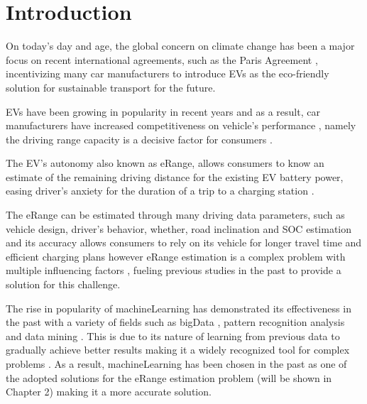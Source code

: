 \chapter{Introduction}
\label{cha:introduction}

On today's day and age, the global concern on climate
change has been a major focus on recent international agreements,
such as the Paris Agreement \citep{parisAgreement},
incentivizing many car manufacturers to introduce
\gls{EVs} as the eco-friendly
solution for sustainable transport for the future.

\gls{EVs} have been growing in popularity in
recent years and as a result, car manufacturers have
increased competitiveness on vehicle's performance
\citep{evCompetitiveness}, namely the driving range 
capacity is a decisive factor for consumers \citep{EGBUE2012717}.

The \gls{EV}'s autonomy also known as \gls{eRange},
allows consumers to know an estimate of the
remaining driving distance for the existing \gls{EV}
battery power, easing driver's anxiety for the duration
of a trip to a charging station \citep{eRangeFactors, driverAnxiety}.

The \gls{eRange} can be estimated through many
driving data parameters,
such as vehicle design, driver's behavior, whether,
road inclination and \gls{SOC} estimation and its
accuracy allows consumers to rely
on its vehicle for longer travel time and efficient
charging plans however \gls{eRange} estimation
is a complex problem with multiple influencing
factors \citep{predictionOfeRange}, fueling previous
studies in the past to provide a solution for this challenge.

The rise in popularity of \gls{machineLearning}
\citep{machineLearningCaseStudy}
has demonstrated its effectiveness in the
past with a variety of fields such as \gls{bigData}
\citep{machineLearningBigData, machineLearningBigData2},
pattern recognition analysis and data mining
\citep{businessDataMining}.  
This is due to its nature of learning 
from previous data to gradually achieve
better results making it a widely 
recognized tool for complex problems 
\citep{mitchelllearning}.
As a result, \gls{machineLearning}
has been chosen in the past 
as one of the adopted solutions for 
the \gls{eRange} estimation problem 
(will be shown in Chapter 2)
making it a more accurate solution.  

